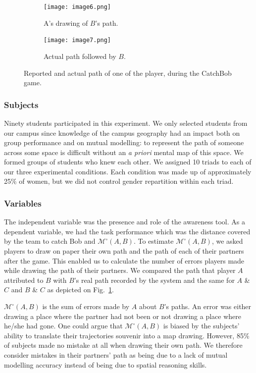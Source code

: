 \documentclass[natbib]{svjour3}
\newcommand{\gModel}[2]{{$\mathcal{M}^{\circ}(#1, #2)$}}
\begin{document}
\begin{figure}[h!t]
        \centering
        \begin{subfigure}{.45\textwidth}
            \texttt{[image: image6.png]}
            \caption{A's drawing of $B$'s path.}
        \end{subfigure}
        \begin{subfigure}{.4\textwidth}
            \texttt{[image: image7.png]}
            \caption{Actual path followed by $B$.}
        \end{subfigure}
        \caption{Reported and actual path of one of the player, during the {\sc
        CatchBob} game.}
        \label{study2:paths}
\end{figure}

\subsubsection*{Subjects}


Ninety students participated in this experiment. We only selected students from
our campus since knowledge of the campus geography had an impact both on group
performance and on mutual modelling: to represent the path of someone across
some space is difficult without an \textit{a priori} mental map of this space.
We formed groups of students who knew each other. We assigned 10 triads to each
of our three experimental conditions. Each condition was made up of
approximately 25\% of women, but we did not control gender repartition within
each triad.

\subsubsection*{Variables}

The independent variable was the presence and role of the awareness tool. As a
dependent variable, we had the task performance which was the distance covered
by the team to catch Bob and \gModel{A}{B}. To estimate \gModel{A}{B}, we asked
players to draw on paper their own path and the path of each of their partners
after the game. This enabled us to calculate the number of errors players made
while drawing the path of their partners. We compared the path that player $A$
attributed to $B$ with $B$'s real path recorded by the system and the same for
$A$ \& $C$ and $B$ \& $C$ as depicted on Fig.~\ref{study2:paths}. 

\gModel{A}{B} is the sum of errors made by $A$ about $B$'s paths. An error was
either drawing a place where the partner had not been or not drawing a place
where he/she had gone. One could argue that \gModel{A}{B} is biased by the
subjects' ability to translate their trajectories souvenir into a map drawing.
However, 85\% of subjects made no mistake at all when drawing their own path. We
therefore consider mistakes in their partners' path as being due to a lack of
mutual modelling accuracy instead of being due to spatial reasoning skills.
\end{document}
